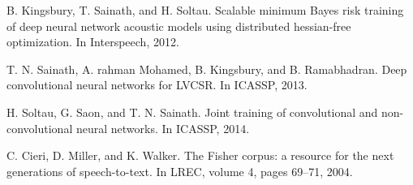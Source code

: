 \documentclass[12pt]{article}
\begin{document}
\begin{thebibliography}{8}
    B. Kingsbury, T. Sainath, and H. Soltau. Scalable minimum Bayes risk training of deep neural
    network acoustic models using distributed hessian-free optimization. In Interspeech, 2012.

    T. N. Sainath, A. rahman Mohamed, B. Kingsbury, and B. Ramabhadran. Deep convolutional
    neural networks for LVCSR. In ICASSP, 2013.

    H. Soltau, G. Saon, and T. N. Sainath. Joint training of convolutional and non-convolutional
    neural networks. In ICASSP, 2014.

    C. Cieri, D. Miller, and K. Walker. The Fisher corpus: a resource for the next generations of
    speech-to-text. In LREC, volume 4, pages 69–71, 2004.

\end{thebibliography}
\end{document}
